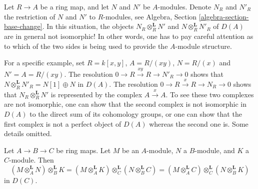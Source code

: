 \begin{remark}[Warning]
\label{remark-warning-compute-base-change}
Let $R \to A$ be a ring map, and let $N$ and $N'$ be $A$-modules.
Denote $N_R$ and $N'_R$ the restriction of $N$ and $N'$ to $R$-modules,
see Algebra, Section \ref{algebra-section-base-change}.
In this situation, the objects $N_R \otimes_R^\mathbf{L} N'$
and $N \otimes_R^\mathbf{L} N'_R$ of $D(A)$ are in general
not isomorphic! In other words, one has to pay careful attention
as to which of the two sides is being used to provide the
$A$-module structure.

\medskip\noindent
For a specific example, set $R = k[x, y]$, $A = R/(xy)$, $N = R/(x)$
and $N' = A = R/(xy)$. The resolution
$0 \to R \xrightarrow{xy} R \to N'_R \to 0$
shows that $N \otimes_R^\mathbf{L} N'_R = N[1] \oplus N$ in $D(A)$.
The resolution
$0 \to R \xrightarrow{x} R \to N_R \to 0$
shows that $N_R \otimes_R^\mathbf{L} N'$ is represented by
the complex $A \xrightarrow{x} A$. To see these two complexes
are not isomorphic, one can show that the second complex is
not isomorphic in $D(A)$ to the direct sum of its cohomology groups,
or one can show that the first complex is not a perfect object of $D(A)$
whereas the second one is. Some details omitted.
\end{remark}

\begin{lemma}
\label{lemma-double-base-change}
Let $A \to B \to C$ be ring maps. Let $M$ be an $A$-module,
$N$ a $B$-module, and $K$ a $C$-module. Then
$$
(M \otimes_A^\mathbf{L} N) \otimes_B^\mathbf{L} K =
(M \otimes_A^\mathbf{L} K) \otimes_C^\mathbf{L} (N \otimes_B^\mathbf{L} C) =
(M \otimes_A^\mathbf{L} C) \otimes_C^\mathbf{L} (N \otimes_B^\mathbf{L} K)
$$
in $D(C)$.
\end{lemma}

